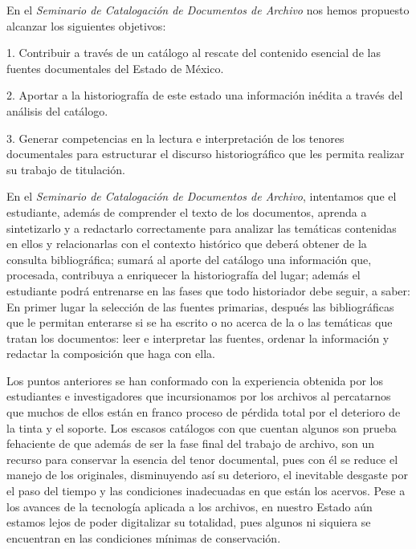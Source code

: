 \medskip
{}
\enlargethispage{1\baselineskip}

\noindent En el \textit{Seminario de Catalogación de Documentos de 
Archivo} nos hemos propuesto alcanzar los siguientes objetivos:

\begin{Obs} 
\item[1.] Contribuir a través de un catálogo al rescate 
del contenido esencial de las fuentes documentales del Estado de 
México. 
\item[2.] Aportar a la historiografía de este estado una 
información inédita a través del análisis del catálogo. 
\item[3.] Generar competencias en la lectura e interpretación de los tenores 
documentales para estructurar el discurso historiográfico que les permita 
realizar su trabajo de titulación. 
\end{Obs}

\medskip 
\noindent En el \textit{Seminario de Catalogación de 
Documentos de Archivo}, intentamos que el estudiante, además de 
comprender el texto de los documentos, aprenda a sintetizarlo y a
redactarlo correctamente para analizar las temáticas contenidas en 
ellos y relacionarlas con el contexto histórico que deberá obtener de 
la consulta bibliográfica; sumará al aporte del catálogo una 
información que, procesada, contribuya a enriquecer la historiografía del 
lugar; además el estudiante podrá entrenarse en las fases que todo 
historiador debe seguir, a saber: En primer lugar la selección de las 
fuentes primarias, después las bibliográficas que le permitan enterarse 
si se ha escrito o no acerca de la o las temáticas que tratan los 
documentos: leer e interpretar las fuentes, ordenar la información y 
redactar la composición que haga con ella.

Los puntos anteriores se han conformado con la experiencia obtenida por 
los estudiantes e investigadores que incursionamos por los archivos al 
percatarnos que muchos de ellos están en franco proceso de pérdida 
total por el deterioro de la tinta y el soporte. Los escasos catálogos 
con que cuentan algunos son prueba fehaciente de que  además de ser la 
fase final del trabajo de archivo, son un recurso para conservar la 
esencia del tenor documental, pues con él se reduce el manejo de los 
originales, disminuyendo así su deterioro, el inevitable desgaste por el 
paso del tiempo y las condiciones inadecuadas en que están los acervos. 
Pese a los avances de la tecnología aplicada a los archivos, en nuestro 
Estado aún  estamos lejos de poder digitalizar su totalidad, pues 
algunos ni siquiera se encuentran en las condiciones mínimas de 
conservación.

